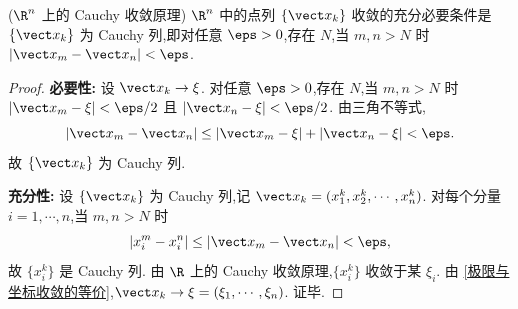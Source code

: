 \begin{theorem}($\R^n$ 上的 Cauchy 收敛原理)\label{Cauchy收敛原理}
$\R^n$ 中的点列 $\{\vect x_k\}$ 收敛的充分必要条件是 $\{\vect x_k\}$ 为 Cauchy 列,即对任意 $\eps>0$,存在 $N$,当 $m,n>N$ 时 $|\vect x_m-\vect x_n|<\eps$.
\end{theorem}

\begin{proof}
\textbf{必要性:} 设 $\vect x_k\to\xi$. 对任意 $\eps>0$,存在 $N$,当 $m,n>N$ 时 $|\vect x_m-\xi|<\eps/2$ 且 $|\vect x_n-\xi|<\eps/2$. 由三角不等式,
\[
|\vect x_m-\vect x_n|\leq|\vect x_m-\xi|+|\vect x_n-\xi|<\eps.
\]
故 $\{\vect x_k\}$ 为 Cauchy 列.

\textbf{充分性:} 设 $\{\vect x_k\}$ 为 Cauchy 列,记 $\vect x_k=(x_1^k,x_2^k,\cdots,x_n^k)$. 对每个分量 $i=1,\cdots,n$,当 $m,n>N$ 时
\[
|x_i^m-x_i^n|\leq|\vect x_m-\vect x_n|<\eps,
\]
故 $\{x_i^k\}$ 是 Cauchy 列. 由 $\R$ 上的 Cauchy 收敛原理,$\{x_i^k\}$ 收敛于某 $\xi_i$. 由 \ref{极限与坐标收敛的等价},$\vect x_k\to\xi=(\xi_1,\cdots,\xi_n)$. 证毕.
\end{proof}
